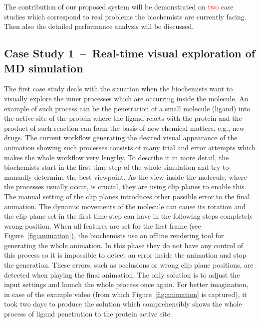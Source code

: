 The contribution of our proposed system will be demonstrated on \textcolor{red}{two} case studies which correspond to real problems the biochemists are currently facing. 
Then also the detailed performance analysis will be discussed.

\subsection{ Case Study 1~--~Real-time visual exploration of MD simulation}
The first case study deals with the situation when the biochemists want to visually explore the inner processes which are occurring inside the molecule. 
An example of such process can be the penetration of a small molecule (ligand) into the active site of the protein where the ligand reacts with the protein and the product of such reaction can form the basis of new chemical matters, e.g., new drugs. 
The current workflow generating the desired visual appearance of the animation showing such processes consists of many trial and error attempts which makes the whole workflow very lengthy. 
To describe it in more detail, the biochemists start in the first time step of the whole simulation and try to manually determine the best viewpoint.
As the view inside the molecule, where the processes usually occur, is crucial, they are using clip planes to enable this.
The manual setting of the clip planes introduces other possible error to the final animation.
The dynamic movements of the molecule can cause its rotation and the clip plane set in the first time step can have in the following steps completely wrong position.
When all features are set for the first frame (see Figure~\ref{fig:animation}), the biochemists use an offline rendering tool for generating the whole animation.
In this phase they do not have any control of this process so it is impossible to detect an error inside the animation and stop the generation.
These errors, such as occlusions or wrong clip plane positions, are detected when playing the final animation.
The only solution is to adjust the input settings and launch the whole process once again.
For better imagination, in case of the example video (from which Figure~\ref{fig:animation} is captured), it took two days to produce the solution which comprehensibly shows the whole process of ligand penetration to the protein active site.

